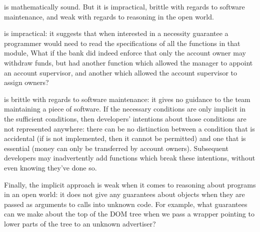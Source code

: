  is mathematically sound. But it is impractical, brittle with
regards to software maintenance, and weak with regards to reasoning in
the open world.


 is impractical: it suggests that when interested in
a necessity guarantee a programmer would need to read the
specifications of all the functions in that module, 
 What if
the bank did indeed enforce that only the account owner may withdraw
funds, but had another function which allowed the manager to appoint
an account supervisor, and another which allowed the account
supervisor to assign owners?

 is brittle with regards to software maintenance:
 it gives no guidance to the team maintaining a piece of
software.  If the necessary conditions are only implicit in the
sufficient conditions, then developers' intentions about those
conditions are not represented anywhere: there can be no distinction
between a condition that is accidental (if  is not
implemented, then it cannot be permitted) and one that is essential
(money can only be transferred by account owners).
Subsequent developers may inadvertently add functions which break these
intentions, without even knowing they've done so.

Finally, the implicit approach  is weak when it comes to reasoning
about programs in an open world:  it does not give any
guarantees about objects when they are passed as arguments to calls
into unknown code. For example, what guarantees can we make about the
top of the DOM tree when we pass a wrapper pointing to lower parts of
the tree to an unknown advertiser?

